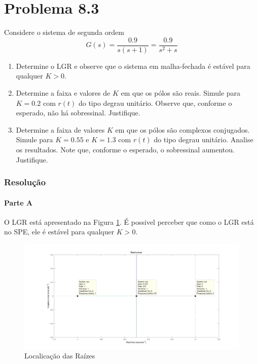 \documentclass[
]{book}
\providecommand{\tightlist}{%
  \setlength{\itemsep}{0pt}\setlength{\parskip}{0pt}}
\theoremstyle{definition}
\theoremstyle{definition}
\theoremstyle{definition}
\theoremstyle{remark}
\begin{document}
\hypertarget{problema-8.3}{%
\section*{Problema 8.3}\label{problema-8.3}}

Considere o sistema de segunda ordem
\[
G(s) = \frac{0.9}{s(s+1)} = \frac{0.9}{s^2+s}
\]

\begin{enumerate}
\def\labelenumi{\alph{enumi}.}
\tightlist
\item
  Determine o LGR e observe que o sistema em malha-fechada é estável para qualquer \(K>0\).
\item
  Determine a faixa e valores de \(K\) em que os pólos são reais. Simule para \(K=0.2\) com \(r(t)\) do tipo degrau unitário. Observe que, conforme o esperado, não há sobressinal. Justifique.
\item
  Determine a faixa de valores \(K\) em que os pólos são complexos conjugados. Simule para \(K = 0.55\) e \(K = 1.3\) com \(r(t)\) do tipo degrau unitário. Analise os resultados. Note que, conforme o esperado, o sobressinal aumentou. Justifique.
\end{enumerate}

\hypertarget{resoluuxe7uxe3o-24}{%
\subsubsection*{Resolução}\label{resoluuxe7uxe3o-24}}

\hypertarget{parte-a-11}{%
\paragraph{Parte A}\label{parte-a-11}}

O LGR está apresentado na Figura \ref{fig:fig8R5}. É possivel perceber que como o LGR está no SPE, ele é estável para qualquer \(K > 0\).

\begin{figure}

{\centering \includegraphics{Imagens/Lab8/Resolução/fig5} 

}

\caption{Localicação das Raízes}\label{fig:fig8R5}
\end{figure}
\end{document}
